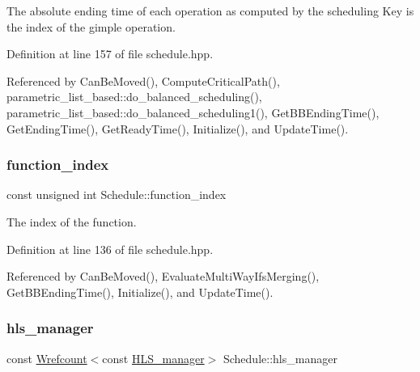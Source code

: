 The absolute ending time of each operation as computed by the scheduling Key is the index of the gimple operation. 



Definition at line 157 of file schedule.\+hpp.



Referenced by Can\+Be\+Moved(), Compute\+Critical\+Path(), parametric\+\_\+list\+\_\+based\+::do\+\_\+balanced\+\_\+scheduling(), parametric\+\_\+list\+\_\+based\+::do\+\_\+balanced\+\_\+scheduling1(), Get\+B\+B\+Ending\+Time(), Get\+Ending\+Time(), Get\+Ready\+Time(), Initialize(), and Update\+Time().

\mbox{\label{classSchedule_a51c826c36437ed5ec523725815cc25d0}} 
\subsubsection{\texorpdfstring{function\+\_\+index}{function\_index}}
{\footnotesize\ttfamily const unsigned int Schedule\+::function\+\_\+index\hspace{0.3cm}{\ttfamily [private]}}



The index of the function. 



Definition at line 136 of file schedule.\+hpp.



Referenced by Can\+Be\+Moved(), Evaluate\+Multi\+Way\+Ifs\+Merging(), Get\+B\+B\+Ending\+Time(), Initialize(), and Update\+Time().

\mbox{\label{classSchedule_ac9335f00e46ddb07553a680243fab2b4}} 
\subsubsection{\texorpdfstring{hls\+\_\+manager}{hls\_manager}}
{\footnotesize\ttfamily const \hyperlink{classWrefcount}{Wrefcount}$<$const \hyperlink{classHLS__manager}{H\+L\+S\+\_\+manager}$>$ Schedule\+::hls\+\_\+manager\hspace{0.3cm}{\ttfamily [private]}}



